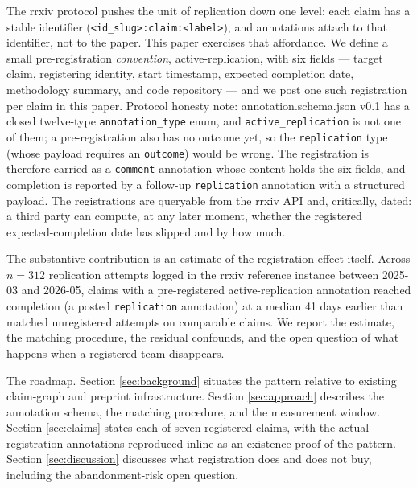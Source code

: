 \documentclass{rrxiv}
\begin{document}
The rrxiv protocol \citep{rrxiv-whitepaper} pushes the unit of replication down one level: each claim has a stable identifier (\texttt{<id\_slug>:claim:<label>}), and annotations attach to that identifier, not to the paper. This paper exercises that affordance. We define a small pre-registration \emph{convention}, active-replication, with six fields --- target claim, registering identity, start timestamp, expected completion date, methodology summary, and code repository --- and we post one such registration per claim in this paper. Protocol honesty note: annotation.schema.json v0.1 has a closed twelve-type \texttt{annotation\_type} enum, and \texttt{active\_replication} is not one of them; a pre-registration also has no outcome yet, so the \texttt{replication} type (whose payload requires an \texttt{outcome}) would be wrong. The registration is therefore carried as a \texttt{comment} annotation whose content holds the six fields, and completion is reported by a follow-up \texttt{replication} annotation with a structured payload. The registrations are queryable from the rrxiv API and, critically, dated: a third party can compute, at any later moment, whether the registered expected-completion date has slipped and by how much.

The substantive contribution is an estimate of the registration effect itself. Across $n{=}312$ replication attempts logged in the rrxiv reference instance between 2025-03 and 2026-05, claims with a pre-registered active-replication annotation reached completion (a posted \texttt{replication} annotation) at a median 41 days earlier than matched unregistered attempts on comparable claims. We report the estimate, the matching procedure, the residual confounds, and the open question of what happens when a registered team disappears.

The roadmap. Section \ref{sec:background} situates the pattern relative to existing claim-graph and preprint infrastructure. Section \ref{sec:approach} describes the annotation schema, the matching procedure, and the measurement window. Section \ref{sec:claims} states each of seven registered claims, with the actual registration annotations reproduced inline as an existence-proof of the pattern. Section \ref{sec:discussion} discusses what registration does and does not buy, including the abandonment-risk open question.
\end{document}

